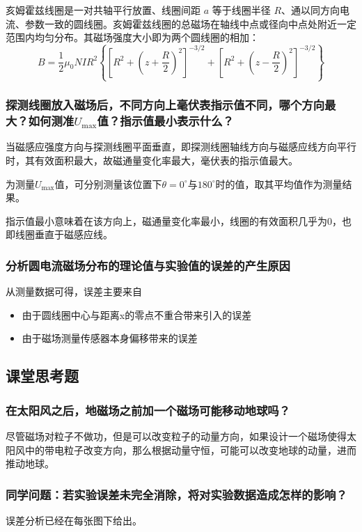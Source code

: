 \documentclass[11pt]{article}
\begin{document}
	亥姆霍兹线圈是一对共轴平行放置、线圈间距 $a$ 等于线圈半径 $R$、通以同方向电流、参数一致的圆线圈。亥姆霍兹线圈的总磁场在轴线中点或径向中点处附近一定范围内均匀分布。其磁场强度大小即为两个圆线圈的相加：
	\begin{equation*}
		B=\frac12\mu_0NIR^2\left\{\left[R^2+\left(z + \frac R2\right)^2\right]^{-3/2}+\left[R^2+\left(z - \frac R2\right)^2\right]^{-3/2}\right\} 
	\end{equation*}
	
	\subsubsection{探测线圈放入磁场后，不同方向上毫伏表指示值不同，哪个方向最大？如何测准$ U_{\max} $值？指示值最小表示什么？}
	当磁感应强度方向与探测线圈平面垂直，即探测线圈轴线方向与磁感应线方向平行时，其有效面积最大，故磁通量变化率最大，毫伏表的指示值最大。
	
	为测量$ U_{\max} $值，可分别测量该位置下$ \theta=0^\circ $与$ 180^\circ $时的值，取其平均值作为测量结果。
	
	指示值最小意味着在该方向上，磁通量变化率最小，线圈的有效面积几乎为0，也即线圈垂直于磁感应线。
	
	\subsubsection{分析圆电流磁场分布的理论值与实验值的误差的产生原因}
	从测量数据可得，误差主要来自
	\begin{itemize}
		\item 由于圆线圈中心与距离x的零点不重合带来引入的误差
		\item 由于磁场测量传感器本身偏移带来的误差
	\end{itemize}
	
	\subsection{课堂思考题}
	\subsubsection{在太阳风之后，地磁场之前加一个磁场可能移动地球吗？}
	尽管磁场对粒子不做功，但是可以改变粒子的动量方向，如果设计一个磁场使得太阳风中的带电粒子改变方向，那么根据动量守恒，可能可以改变地球的动量，进而推动地球。
	
	\subsubsection{同学问题：若实验误差未完全消除，将对实验数据造成怎样的影响？}
	误差分析已经在每张图下给出。
	
\end{document}
